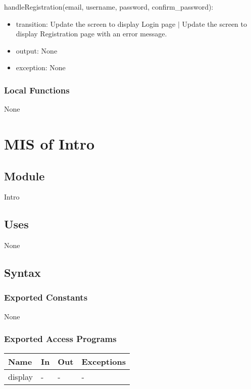 \documentclass[12pt, titlepage]{article}
\begin{document}
\noindent handleRegistration(email, username, password, confirm\_password):
\begin{itemize}
\item transition: Update the screen to display Login page $|$ Update the screen to display
Registration page with an error message.
\item output: None
\item exception: None

\end{itemize}

\subsubsection{Local Functions}

None

\newpage

\section{MIS of Intro} \label{IntroModule}

\subsection{Module}

Intro

\subsection{Uses}

None

\subsection{Syntax}

\subsubsection{Exported Constants}

None

\subsubsection{Exported Access Programs}

\begin{center}
\begin{tabular}{p{2cm} p{4cm} p{4cm} p{2cm}}
\hline
\textbf{Name} & \textbf{In} & \textbf{Out} & \textbf{Exceptions} \\
\hline
display & - & - & - \\
\hline
\end{tabular}
\end{center}
\end{document}
